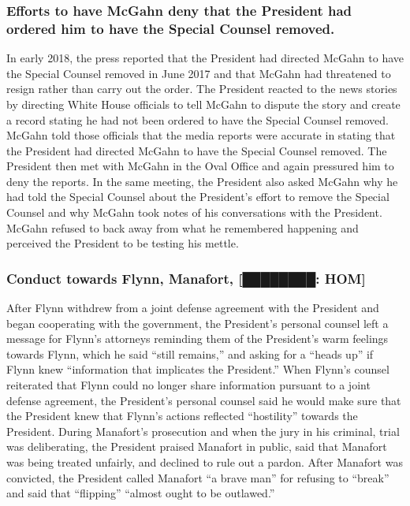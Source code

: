 \subsubsection*{Efforts to have McGahn deny that the President had ordered him to have the Special Counsel removed.}

In early 2018, the press reported that the President had directed McGahn to have the Special Counsel removed in June 2017 and that McGahn had threatened to resign rather than carry out the order.
The President reacted to the news stories by directing White House officials to tell McGahn to dispute the story and create a record stating he had not been ordered to have the Special Counsel removed.
McGahn told those officials that the media reports were accurate in stating that the President had directed McGahn to have the Special Counsel removed.
The President then met with McGahn in the Oval Office and again pressured him to deny the reports.
In the same meeting, the President also asked McGahn why he had told the Special Counsel about the President’s effort to remove the Special Counsel and why McGahn took notes of his conversations with the President.
McGahn refused to back away from what he remembered happening and perceived the President to be testing his mettle.

\subsubsection*{Conduct towards Flynn, Manafort, [████████: HOM]}

After Flynn withdrew from a joint defense agreement with the President and began cooperating with the government, the President’s personal counsel left a message for Flynn’s attorneys reminding them of the President’s warm feelings towards Flynn, which he said “still remains,” and asking for a “heads up” if Flynn knew “information that implicates the President.”
When Flynn’s counsel reiterated that Flynn could no longer share information pursuant to a joint defense agreement, the President’s personal counsel said he would make sure that the President knew that Flynn’s actions reflected “hostility” towards the President.
During Manafort’s prosecution and when the jury in his criminal, trial was deliberating, the President praised Manafort in public, said that Manafort was being treated unfairly, and declined to rule out a pardon.
After Manafort was convicted, the President called Manafort “a brave man” for refusing to “break” and said that “flipping” “almost ought to be outlawed.”

